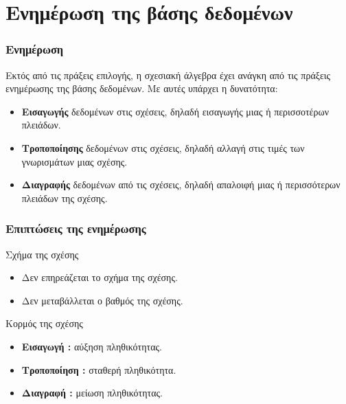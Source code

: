 
\section[{\en dbUpdate}]{\textgreek{Ενημέρωση της βάσης δεδομένων}}


\begin{frame}
\frametitle{Ενημέρωση}
\begin{minipage}{\wE}
Εκτός από τις πράξεις επιλογής, η σχεσιακή άλγεβρα έχει ανάγκη από τις πράξεις
ενημέρωσης της βάσης δεδομένων.
Με αυτές υπάρχει η δυνατότητα:
\begin{itemize} \itemsep9pt
    \item {\bf Εισαγωγής} δεδομένων στις σχέσεις, δηλαδή εισαγωγής μιας ή περισσοτέρων
          πλειάδων.
    \item {\bf Τροποποίησης} δεδομένων στις σχέσεις, δηλαδή αλλαγή στις τιμές των
          γνωρισμάτων μιας σχέσης.
    \item {\bf Διαγραφής} δεδομένων από τις σχέσεις, δηλαδή απαλοιφή μιας ή περισσότερων
          πλειάδων της σχέσης.          
\end{itemize}
\end{minipage}  
\end{frame}

\begin{frame}
\frametitle{Επιπτώσεις της ενημέρωσης}
\begin{minipage}{\wE}
  \begin{block}{Σχήμα της σχέσης}
    \begin{itemize} \itemsep9pt
      \item Δεν επηρεάζεται το σχήμα της σχέσης.
      \item Δεν μεταβάλλεται ο βαθμός της σχέσης.
    \end{itemize}
  \end{block}
  \begin{block}{Κορμός της σχέσης}
    \begin{itemize} \itemsep9pt
      \item {\bf Εισαγωγή :} αύξηση πληθικότητας.
      \item {\bf Τροποποίηση :} σταθερή πληθικότητα.
      \item {\bf Διαγραφή :} μείωση πληθικότητας.
    \end{itemize}
  \end{block}
\end{minipage}  
\end{frame}

